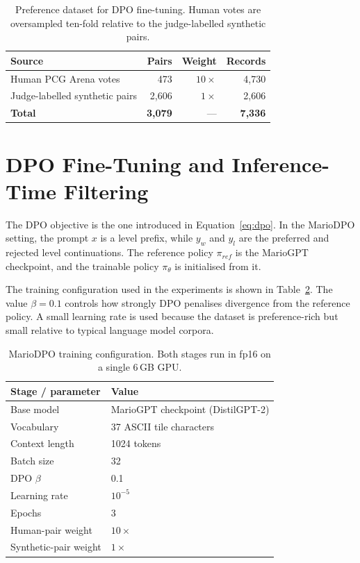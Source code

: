 \documentclass[shortabstract, mgr, english]{iithesis}
\begin{document}
\begin{table}[H]
\centering
\caption{Preference dataset for DPO fine-tuning. Human votes are oversampled
ten-fold relative to the judge-labelled synthetic pairs.}
\label{tab:dpo-dataset}
\begin{tabular}{lrrr}
\toprule
\textbf{Source} & \textbf{Pairs} & \textbf{Weight} & \textbf{Records} \\
\midrule
Human PCG Arena votes          & 473   & $10\times$ & 4,730 \\
Judge-labelled synthetic pairs & 2,606 & $1\times$  & 2,606 \\
\midrule
\textbf{Total}                 & \textbf{3,079} & --- & \textbf{7,336} \\
\bottomrule
\end{tabular}
\end{table}

\section[DPO Fine-Tuning and Inference-Time Filtering]{DPO Fine-Tuning and Inference-Time Filtering}
\label{subsec:dpo-training-details}

The DPO objective is the one introduced in Equation~\ref{eq:dpo}. In the MarioDPO
setting, the prompt $x$ is a level prefix, while
$y_w$ and $y_l$ are the preferred and rejected level continuations. The
reference policy $\pi_{ref}$ is the MarioGPT checkpoint, and the trainable policy
$\pi_\theta$ is initialised from it.

The training configuration used in the experiments is shown in
Table~\ref{tab:dpo-config}. The value $\beta=0.1$ controls how strongly
DPO penalises divergence from the reference policy. A small learning rate is used
because the dataset is preference-rich but small relative to typical language
model corpora.

\begin{table}[H]
\centering
\caption{MarioDPO training configuration. Both stages run in fp16 on a single
$6$\,GB GPU.}
\label{tab:dpo-config}
\begin{tabular}{ll}
\toprule
\textbf{Stage / parameter} & \textbf{Value} \\
\midrule
Base model & MarioGPT checkpoint (DistilGPT-2) \\
Vocabulary & 37 ASCII tile characters \\
Context length & 1024 tokens \\
Batch size & 32 \\
DPO $\beta$ & 0.1 \\
Learning rate & $10^{-5}$ \\
Epochs & 3 \\
Human-pair weight & $10\times$ \\
Synthetic-pair weight & $1\times$ \\
\bottomrule
\end{tabular}
\end{table}
\end{document}
